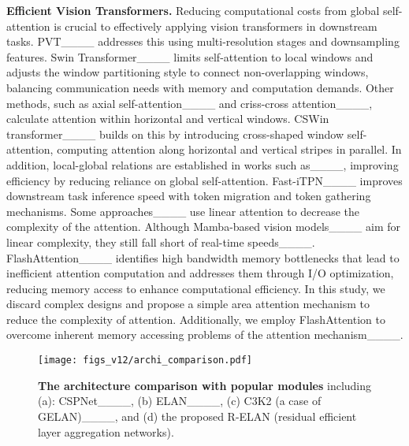 \noindent\textbf{Efficient Vision Transformers.} 
Reducing computational costs from global self-attention is crucial to effectively applying vision transformers in downstream tasks. PVT____ addresses this using multi-resolution stages and downsampling features. 
%
Swin Transformer____ limits self-attention to local windows and adjusts the window partitioning style to connect non-overlapping windows, balancing communication needs with memory and computation demands.
%
Other methods, such as axial self-attention____ and criss-cross attention____, calculate attention within horizontal and vertical windows. CSWin transformer____ builds on this by introducing cross-shaped window self-attention, computing attention along horizontal and vertical stripes in parallel.
%
In addition, local-global relations are established in works such as____, improving efficiency by reducing reliance on global self-attention.
%
Fast-iTPN____ improves downstream task inference speed with token migration and token gathering mechanisms.
%
Some approaches____ use linear attention to decrease the complexity of the attention. Although Mamba-based vision models____ aim for linear complexity, they still fall short of real-time speeds____.
%
FlashAttention____ identifies high bandwidth memory bottlenecks that lead to inefficient attention computation and addresses them through I/O optimization, reducing memory access to enhance computational efficiency.
%
In this study, we discard complex designs and propose a simple area attention mechanism to reduce the complexity of attention. Additionally, we employ FlashAttention to overcome inherent memory accessing problems of the attention mechanism____.



\begin{figure*}[!htb]
\centering
\texttt{[image: figs\_v12/archi\_comparison.pdf]}
\caption{\textbf{The architecture comparison with popular modules} including (a): CSPNet____, (b) ELAN____, (c) C3K2 (a case of GELAN)____, and (d) the proposed R-ELAN (residual efficient layer aggregation networks). }
\label{fig:archi_comparison}
\end{figure*}